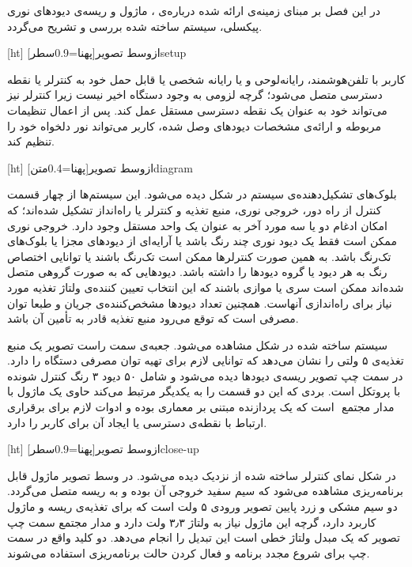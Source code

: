 
در این فصل بر مبنای زمینه‌ی ارائه شده درباره‌ی ، ماژول  و ریسه‌ی دیودهای نوری پیکسلی، سیستم ساخته شده بررسی و تشریح می‌گردد.

[ht]
‌ازوسط
‌تصویر[پهنا=0.9‌سطر]{setup}


کاربر با تلفن‌هوشمند، رایانه‌لوحی و یا رایانه شخصی یا قابل حمل خود به کنترلر یا نقطه دسترسی  متصل می‌شود؛ گرچه لزومی به وجود دستگاه اخیر نیست زیرا کنترلر نیز می‌تواند خود به عنوان یک نقطه دسترسی مستقل عمل کند. پس از اعمال تنظیمات مربوطه و ارائه‌ی مشخصات دیودهای وصل شده، کاربر می‌تواند نور دلخواه خود را تنظیم کند.

[ht]
‌ازوسط
‌تصویر[پهنا=0.4‌متن]{diagram}

بلوک‌های تشکیل‌دهنده‌ی سیستم در شکل  دیده می‌شود. این سیستم‌ها از چهار قسمت کنترل از راه دور، خروجی نوری، منبع تغذیه و کنترلر یا راه‌انداز تشکیل شده‌اند؛ که امکان ادغام دو یا سه مورد آخر به عنوان یک واحد مستقل وجود دارد. خروجی نوری ممکن است فقط یک دیود نوری چند رنگ باشد یا آرایه‌ای از دیودهای مجزا یا بلوک‌های تک‌رنگ باشد. به همین صورت کنترلرها ممکن است تک‌رنگ باشند یا توانایی اختصاص رنگ به هر دیود یا گروه دیودها را داشته باشد. دیودهایی که به صورت گروهی متصل شده‌اند ممکن است سری یا موازی باشند که این انتخاب تعیین کننده‌ی ولتاژ تغذیه مورد نیاز برای راه‌اندازی آنهاست. همچنین تعداد دیودها مشخص‌کننده‌ی جریان و طبعا توان مصرفی است که توقع می‌رود منبع تغذیه قادر به تأمین آن باشد.


سیستم ساخته شده‌ در شکل  مشاهده می‌شود. جعبه‌ی سمت راست تصویر یک منبع تغذیه‌ی ۵ ولتی را نشان می‌دهد که توانایی لازم برای تهیه توان مصرفی دستگاه را دارد. در سمت چپ تصویر ریسه‌ی دیودها دیده می‌شود و شامل ۵۰ دیود ۳ رنگ کنترل شونده با پروتکل  است. بردی که این دو قسمت را به یکدیگر مرتبط می‌کند حاوی یک ماژول  با مدار مجتمع ‌ است که یک پردازنده مبتنی بر معماری  بوده و ادوات لازم برای برقراری ارتباط با نقطه‌ی دسترسی  یا ایجاد آن برای کاربر را دارد.

[ht]
‌ازوسط
‌تصویر[پهنا=0.9‌سطر]{close-up}

در شکل  نمای کنترلر ساخته شده از نزدیک دیده می‌شود. در وسط تصویر ماژول  قابل برنامه‌ریزی مشاهده می‌شود که سیم سفید خروجی آن بوده و به ریسه متصل می‌گردد. دو سیم مشکی و زرد پایین تصویر ورودی ۵ ولت است که برای تغذیه‌ی ریسه و ماژول کاربرد دارد، گرچه این ماژول نیاز به ولتاژ ۳٫۳ ولت دارد و مدار مجتمع سمت چپ تصویر که یک مبدل ولتاژ خطی است این تبدیل را انجام می‌دهد. دو کلید واقع در سمت چپ برای شروع مجدد برنامه و فعال کردن حالت برنامه‌ریزی استفاده می‌شوند.

